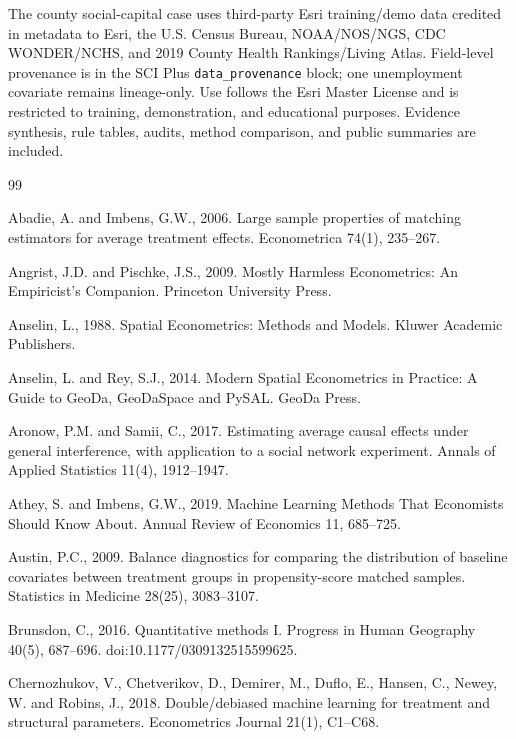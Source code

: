 \documentclass{article}
\begin{document}
The county social-capital case uses third-party Esri training/demo data credited in metadata to Esri, the U.S. Census Bureau, NOAA/NOS/NGS, CDC WONDER/NCHS, and 2019 County Health Rankings/Living Atlas. Field-level provenance is in the SCI Plus \texttt{data\_provenance} block; one unemployment covariate remains lineage-only. Use follows the Esri Master License and is restricted to training, demonstration, and educational purposes. Evidence synthesis, rule tables, audits, method comparison, and public summaries are included.



\begin{thebibliography}{99}

Abadie, A. and Imbens, G.W., 2006. Large sample properties of matching estimators for average treatment effects. Econometrica 74(1), 235--267.

Angrist, J.D. and Pischke, J.S., 2009. Mostly Harmless Econometrics: An Empiricist's Companion. Princeton University Press.

Anselin, L., 1988. Spatial Econometrics: Methods and Models. Kluwer Academic Publishers.

Anselin, L. and Rey, S.J., 2014. Modern Spatial Econometrics in Practice: A Guide to GeoDa, GeoDaSpace and PySAL. GeoDa Press.

Aronow, P.M. and Samii, C., 2017. Estimating average causal effects under general interference, with application to a social network experiment. Annals of Applied Statistics 11(4), 1912--1947.

Athey, S. and Imbens, G.W., 2019. Machine Learning Methods That Economists Should Know About. Annual Review of Economics 11, 685--725.

Austin, P.C., 2009. Balance diagnostics for comparing the distribution of baseline covariates between treatment groups in propensity-score matched samples. Statistics in Medicine 28(25), 3083--3107.

Brunsdon, C., 2016. Quantitative methods I. Progress in Human Geography 40(5), 687--696. doi:10.1177/0309132515599625.

Chernozhukov, V., Chetverikov, D., Demirer, M., Duflo, E., Hansen, C., Newey, W. and Robins, J., 2018. Double/debiased machine learning for treatment and structural parameters. Econometrics Journal 21(1), C1--C68.


\end{thebibliography}
\end{document}
